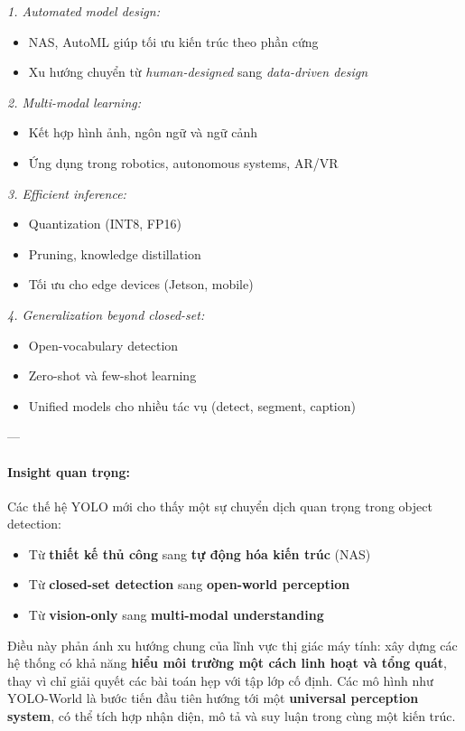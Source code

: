 \textit{1. Automated model design:}
\begin{itemize}
	\item NAS, AutoML giúp tối ưu kiến trúc theo phần cứng
	\item Xu hướng chuyển từ \textit{human-designed} sang \textit{data-driven design}
\end{itemize}

\textit{2. Multi-modal learning:}
\begin{itemize}
	\item Kết hợp hình ảnh, ngôn ngữ và ngữ cảnh
	\item Ứng dụng trong robotics, autonomous systems, AR/VR
\end{itemize}

\textit{3. Efficient inference:}
\begin{itemize}
	\item Quantization (INT8, FP16)
	\item Pruning, knowledge distillation
	\item Tối ưu cho edge devices (Jetson, mobile)
\end{itemize}

\textit{4. Generalization beyond closed-set:}
\begin{itemize}
	\item Open-vocabulary detection
	\item Zero-shot và few-shot learning
	\item Unified models cho nhiều tác vụ (detect, segment, caption)
\end{itemize}

---

\paragraph{Insight quan trọng:}

Các thế hệ YOLO mới cho thấy một sự chuyển dịch quan trọng trong object detection:

\begin{itemize}
	\item Từ \textbf{thiết kế thủ công} sang \textbf{tự động hóa kiến trúc} (NAS)
	\item Từ \textbf{closed-set detection} sang \textbf{open-world perception}
	\item Từ \textbf{vision-only} sang \textbf{multi-modal understanding}
\end{itemize}

Điều này phản ánh xu hướng chung của lĩnh vực thị giác máy tính: xây dựng các hệ thống có khả năng \textbf{hiểu môi trường một cách linh hoạt và tổng quát}, thay vì chỉ giải quyết các bài toán hẹp với tập lớp cố định. Các mô hình như YOLO-World là bước tiến đầu tiên hướng tới một \textbf{universal perception system}, có thể tích hợp nhận diện, mô tả và suy luận trong cùng một kiến trúc.

